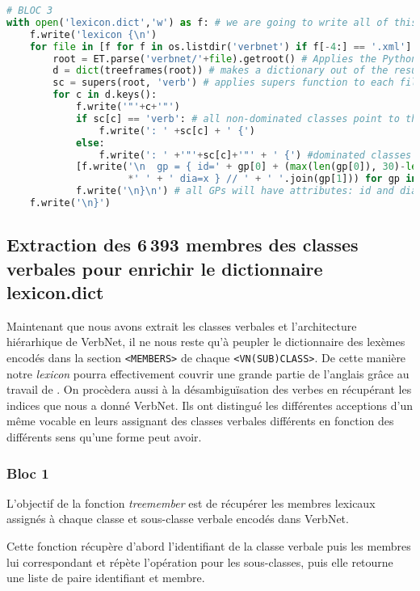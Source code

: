 \begin{lstlisting}[language=Python, caption = Importation de l'architecture des classes verbales, label=fig:archivn]
# BLOC 3
with open('lexicon.dict','w') as f: # we are going to write all of this block into lexicon.dict
    f.write('lexicon {\n')
    for file in [f for f in os.listdir('verbnet') if f[-4:] == '.xml']: # open VerbNet XMl files
        root = ET.parse('verbnet/'+file).getroot() # Applies the Python Element Tree module
        d = dict(treeframes(root)) # makes a dictionary out of the results of treeframes on a file
        sc = supers(root, 'verb') # applies supers function to each file
        for c in d.keys():
            f.write('"'+c+'"')
            if sc[c] == 'verb': # all non-dominated classes point to the default verb class
                f.write(': ' +sc[c] + ' {') 
            else:
                f.write(': ' +'"'+sc[c]+'"' + ' {') #dominated classes point towards their governor
            [f.write('\n  gp = { id=' + gp[0] + (max(len(gp[0]), 30)-len(gp[0]))
                     *' ' + ' dia=x } // ' + ' '.join(gp[1])) for gp in d[c]]
            f.write('\n}\n') # all GPs will have attributes: id and dia
    f.write('\n}')
\end{lstlisting}

\subsection{Extraction des 6\,393 membres des classes verbales pour enrichir le dictionnaire lexicon.dict} \label{extracmembre}

Maintenant que nous avons extrait les classes verbales et l'architecture hiérarhique de VerbNet, il ne nous reste qu'à peupler le dictionnaire des lexèmes encodés dans la section \texttt{<MEMBERS>} de chaque \texttt{<VN(SUB)CLASS>}. De cette manière notre \emph{lexicon} pourra effectivement couvrir une grande partie de l'anglais grâce au travail de \cite{SchulerVerbnetBroadcoverageComprehensive2005}. On procèdera aussi à la désambiguïsation des verbes en récupérant les indices que nous a donné VerbNet. Ils ont distingué les différentes acceptions d'un même vocable en leurs assignant des classes verbales différents en fonction des différents sens qu'une forme peut avoir.

\subsubsection{Bloc 1}
L'objectif de la fonction \emph{treemember} est de récupérer les membres lexicaux assignés à chaque classe et sous-classe verbale encodés dans VerbNet.

Cette fonction récupère d'abord l'identifiant de la classe verbale puis les membres lui correspondant et répète l'opération pour les sous-classes, puis elle retourne une liste de paire identifiant et membre.

